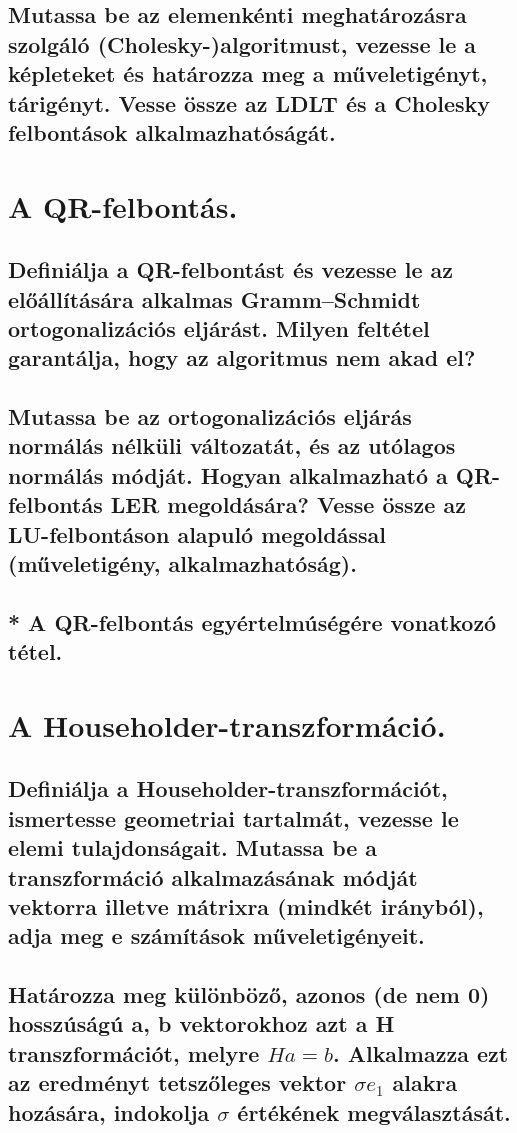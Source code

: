 \documentclass{article}
\begin{document}
        \subsection{Mutassa be az elemenkénti meghatározásra szolgáló (Cholesky-)algoritmust, vezesse le a képleteket és határozza meg a műveletigényt, tárigényt. Vesse össze az LDLT és a Cholesky felbontások alkalmazhatóságát.}


    \section{A QR-felbontás.}
        \subsection{Definiálja a QR-felbontást és vezesse le az előállítására alkalmas Gramm–Schmidt ortogonalizációs eljárást. Milyen feltétel garantálja, hogy az algoritmus nem akad el?}
        \subsection{Mutassa be az ortogonalizációs eljárás normálás nélküli változatát, és az utólagos normálás módját. Hogyan alkalmazható a QR-felbontás LER megoldására? Vesse össze az LU-felbontáson alapuló megoldással (műveletigény, alkalmazhatóság).}
        \subsection{* A QR-felbontás egyértelmúségére vonatkozó tétel.}


    \section{A Householder-transzformáció.}
        \subsection{Definiálja a Householder-transzformációt, ismertesse geometriai tartalmát, vezesse le elemi tulajdonságait. Mutassa be a transzformáció alkalmazásának módját vektorra illetve mátrixra (mindkét irányból), adja meg e számítások műveletigényeit.}
        \subsection{Határozza meg különböző, azonos (de nem 0) hosszúságú a, b vektorokhoz azt a H transzformációt, melyre $Ha = b$. Alkalmazza ezt az eredményt tetszőleges vektor $\sigma e_1$ alakra hozására, indokolja $\sigma$ értékének megválasztását.}
\end{document}

